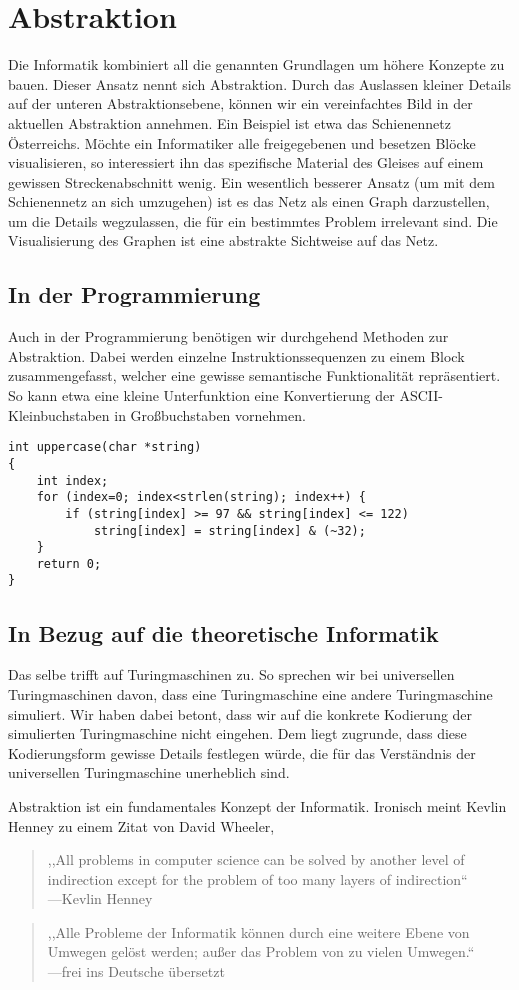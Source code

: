 \chapter{Abstraktion}
%
Die Informatik kombiniert all die genannten Grundlagen um höhere Konzepte
zu bauen. Dieser Ansatz nennt sich Abstraktion. Durch das Auslassen kleiner
Details auf der unteren Abstraktionsebene, können wir ein vereinfachtes Bild
in der aktuellen Abstraktion annehmen.
Ein Beispiel ist etwa das Schienennetz Österreichs. Möchte ein Informatiker
alle freigegebenen und besetzen Blöcke visualisieren, so interessiert ihn
das spezifische Material des Gleises auf einem gewissen Streckenabschnitt
wenig. Ein wesentlich besserer Ansatz (um mit dem Schienennetz an sich
umzugehen) ist es das Netz als einen Graph darzustellen, um die Details
wegzulassen, die für ein bestimmtes Problem irrelevant sind.
Die Visualisierung des Graphen ist eine abstrakte Sichtweise auf das Netz.

\section{In der Programmierung}
%
Auch in der Programmierung benötigen wir durchgehend Methoden zur Abstraktion.
Dabei werden einzelne Instruktionssequenzen zu einem Block zusammengefasst,
welcher eine gewisse semantische Funktionalität repräsentiert. So kann etwa
eine kleine Unterfunktion eine Konvertierung der ASCII-Kleinbuchstaben in
Großbuchstaben vornehmen.

\begin{verbatim}
int uppercase(char *string)
{
    int index;
    for (index=0; index<strlen(string); index++) {
        if (string[index] >= 97 && string[index] <= 122)
            string[index] = string[index] & (~32);
    }
    return 0;
}
\end{verbatim}

\section{In Bezug auf die theoretische Informatik}
%
Das selbe trifft auf Turingmaschinen zu. So sprechen wir bei universellen
Turingmaschinen davon, dass eine Turingmaschine eine andere Turingmaschine
simuliert. Wir haben dabei betont, dass wir auf die konkrete Kodierung der
simulierten Turingmaschine nicht eingehen. Dem liegt zugrunde, dass diese
Kodierungsform gewisse Details festlegen würde, die für das Verständnis
der universellen Turingmaschine unerheblich sind.

Abstraktion ist ein fundamentales Konzept der Informatik. Ironisch meint
Kevlin Henney zu einem Zitat von David Wheeler,
\begin{quotation}
  ,,All problems in computer science can be solved by another level
  of indirection except for the problem of too many layers of indirection`` \\
  ---Kevlin Henney
\end{quotation}
\begin{quotation}
  ,,Alle Probleme der Informatik können durch eine weitere Ebene von Umwegen
  gelöst werden; außer das Problem von zu vielen Umwegen.`` \\
  ---frei ins Deutsche übersetzt
\end{quotation}